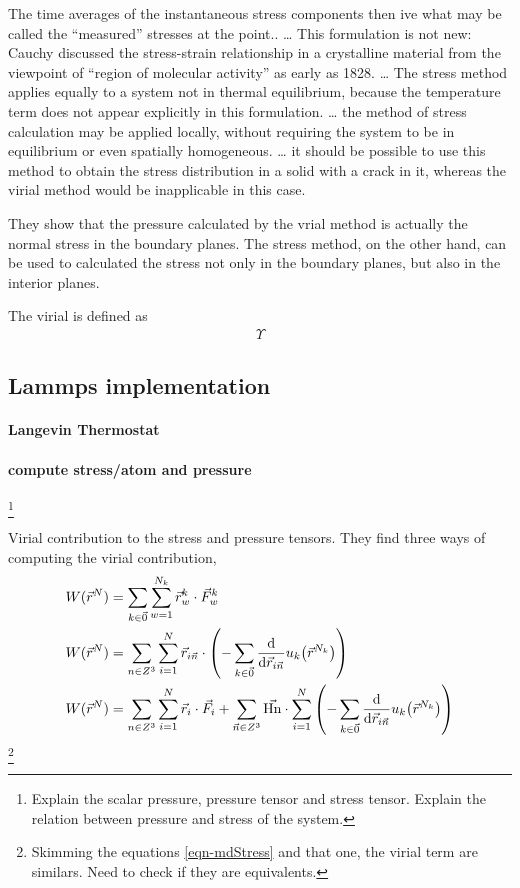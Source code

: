 \documentclass[../../main-notes.tex]{subfiles}
\begin{document}
The time averages of the instantaneous stress components then ive what may be called the ``measured'' stresses at the point.\citep{Tsai_1979}.
\ldots
This formulation is not new: Cauchy discussed the stress-strain relationship in a crystalline material from the viewpoint of ``region of molecular activity'' as early as 1828.
\ldots
The stress method applies equally to a system not in thermal equilibrium, because the temperature term does not appear explicitly in this formulation.
\ldots
the method of stress calculation may be applied locally, without requiring the system to be in equilibrium or even spatially homogeneous.
\ldots
it should be possible to use this method to obtain the stress distribution in a solid with a crack in it, whereas the virial method would be inapplicable in this case.

They show that the pressure calculated by the vrial method is actually the normal stress in the boundary planes.
The stress method, on the other hand, can be used to calculated the stress not only in the boundary planes, but also in the interior planes.

The virial is defined as 
\begin{gather}
    \Upsilon
\end{gather}

\subsection{Lammps implementation}

\paragraph{Langevin Thermostat}

\paragraph{compute stress/atom and pressure}\footnote{Explain the scalar pressure, pressure tensor and stress tensor. Explain the relation between pressure and stress of the system.}

Virial contribution to the stress and pressure tensors\citep{Thompson_Plimpton_Mattson_2009}.
They find three ways of computing the virial contribution,
\begin{align}
    W(\vec{r}^N) &= \sum_{k\in\vec{0}}\sum_{w=1}^{N_k} \vec{r}^k_{w}\cdot\vec{F}^k_{w} \\
    W(\vec{r}^N) &= \sum_{n\in Z^3}\sum_{i=1}^N \vec{r}_{i\vec{n}}\cdot\left(
    -\sum_{k\in\vec{0}}\dv{\vec{r}_{i\vec{n}}}u_k\qty(\vec{r}^{N_k})\right) \\
        W(\vec{r}^N) &= \sum_{n\in Z^3}\sum_{i=1}^N \vec{r}_{i}\cdot\vec{F}_i 
    +\sum_{\vec{n}\in Z^3}\vec{\mathrm{Hn}}\cdot\sum_{i=1}^N\left(
    -\sum_{k\in\vec{0}}\dv{\vec{r}_{i\vec{n}}}u_k\qty(\vec{r}^{N_k})\right)
\end{align}
\footnote{Skimming the equations \eqref{eqn-mdStress} and that one, the virial term are similars. Need to check if they are equivalents. }
\end{document}
